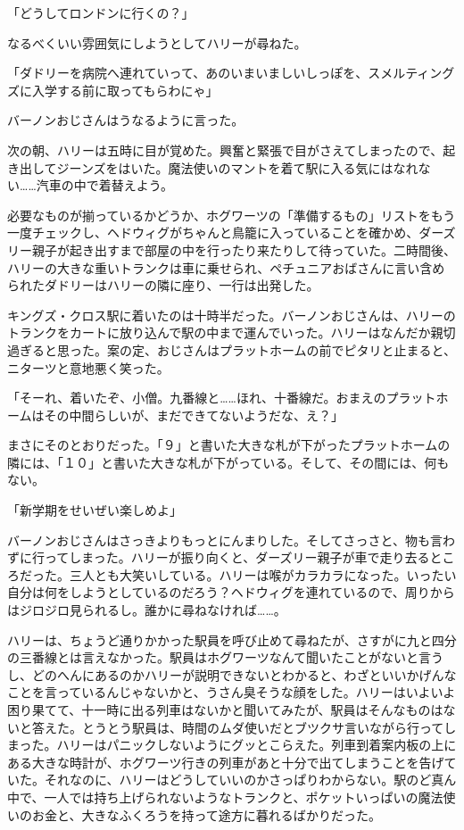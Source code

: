 \documentclass[10pt,a4paper]{article}
\begin{document}
\begin{CJK}{UTF8}{min}
「どうしてロンドンに行くの？」

なるべくいい雰囲気にしようとしてハリーが尋ねた。

「ダドリーを病院へ連れていって、あのいまいましいしっぽを、スメルティングズに入学する前に取ってもらわにゃ」

バーノンおじさんはうなるように言った。



次の朝、ハリーは五時に目が覚めた。興奮と緊張で目がさえてしまったので、起き出してジーンズをはいた。魔法使いのマントを着て駅に入る気にはなれない……汽車の中で着替えよう。

必要なものが揃っているかどうか、ホグワーツの「準備するもの」リストをもう一度チェックし、ヘドウィグがちゃんと鳥籠に入っていることを確かめ、ダーズリー親子が起き出すまで部屋の中を行ったり来たりして待っていた。二時間後、ハリーの大きな重いトランクは車に乗せられ、ペチュニアおばさんに言い含められたダドリーはハリーの隣に座り、一行は出発した。

キングズ・クロス駅に着いたのは十時半だった。バーノンおじさんは、ハリーのトランクをカートに放り込んで駅の中まで運んでいった。ハリーはなんだか親切過ぎると思った。案の定、おじさんはプラットホームの前でピタリと止まると、ニターツと意地悪く笑った。

「そーれ、着いたぞ、小僧。九番線と……ほれ、十番線だ。おまえのプラットホームはその中間らしいが、まだできてないようだな、え？」

まさにそのとおりだった。「９」と書いた大きな札が下がったプラットホームの隣には、「１０」と書いた大きな札が下がっている。そして、その間には、何もない。

「新学期をせいぜい楽しめよ」

バーノンおじさんはさっきよりもっとにんまりした。そしてさっさと、物も言わずに行ってしまった。ハリーが振り向くと、ダーズリー親子が車で走り去るところだった。三人とも大笑いしている。ハリーは喉がカラカラになった。いったい自分は何をしようとしているのだろう？ヘドウィグを連れているので、周りからはジロジロ見られるし。誰かに尋ねなければ……。



ハリーは、ちょうど通りかかった駅員を呼び止めて尋ねたが、さすがに九と四分の三番線とは言えなかった。駅員はホグワーツなんて聞いたことがないと言うし、どのへんにあるのかハリーが説明できないとわかると、わざといいかげんなことを言っているんじゃないかと、うさん臭そうな顔をした。ハリーはいよいよ困り果てて、十一時に出る列車はないかと聞いてみたが、駅員はそんなものはないと答えた。とうとう駅員は、時間のムダ使いだとブツクサ言いながら行ってしまった。ハリーはパニックしないようにグッとこらえた。列車到着案内板の上にある大きな時計が、ホグワーツ行きの列車があと十分で出てしまうことを告げていた。それなのに、ハリーはどうしていいのかさっぱりわからない。駅のど真ん中で、一人では持ち上げられないようなトランクと、ポケットいっぱいの魔法使いのお金と、大きなふくろうを持って途方に暮れるばかりだった。


\end{CJK}
\end{document}
